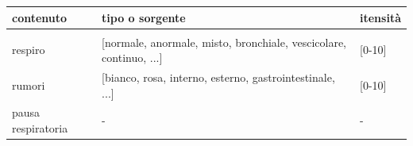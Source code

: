 \begin{frame}
\begin{itemize}
 
 \begin{center}
   \begin{table}[!h]
     \centering
     \begin{tabular}{p{} | p{} l}
       \hline
 	  contenuto
 	& 
 	  tipo o sorgente
 	& 
 	  itensit\`a
       \\\hline\\
 	  respiro
 	& 
	  [normale, anormale, misto, bronchiale, vescicolare, continuo, ...]
 	& 
 	  [0-10]
       \\
 	  rumori
 	& 
 	  [bianco, rosa, interno, esterno, gastrointestinale, ...]
 	& 
 	  [0-10]
       \\
 	  pausa respiratoria
 	& 
 	  -
 	& 
 	  -
       \\\hline
     \end{tabular}
   \end{table}
 \end{center}
  \end{itemize} 
% 
% 

\end{frame}


